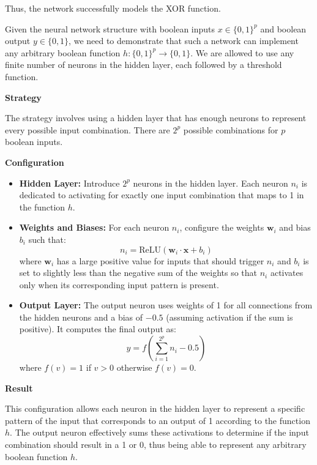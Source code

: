 \documentclass[oneside,solution]{seu-ml-assign}
\begin{document}
Thus, the network successfully models the XOR function.
\subproblem{}

Given the neural network structure with boolean inputs $x \in \{0,1\}^p$ and boolean output $y \in \{0,1\}$,
we need to demonstrate that such a network can implement any arbitrary boolean function $h:\{0,1\}^p \to \{0,1\}$.
We are allowed to use any finite number of neurons in the hidden layer, each followed by a threshold function.

\textbf{\large{Strategy}}

The strategy involves using a hidden layer that has enough neurons to represent every possible input combination.
There are $2^p$ possible combinations for $p$ boolean inputs.

\textbf{\large{Configuration}}
\begin{itemize}
  \item \textbf{Hidden Layer:} Introduce $2^p$ neurons in the hidden layer. Each neuron $n_i$ is dedicated to activating for
        exactly one input combination that maps to 1 in the function $h$.
  \item \textbf{Weights and Biases:} For each neuron $n_i$, configure the weights $\mathbf{w}_i$ and bias $b_i$ such that:
        \begin{equation}
          n_i = \text{ReLU}(\mathbf{w}_i \cdot \mathbf{x} + b_i)
        \end{equation}
        where $\mathbf{w}_i$ has a large positive value for inputs that should trigger $n_i$ and $b_i$ is set to slightly
        less than the negative sum of the weights so that $n_i$ activates only when its corresponding input pattern is present.
  \item \textbf{Output Layer:} The output neuron uses weights of 1 for all connections from the hidden neurons and a bias of $-0.5$
        (assuming activation if the sum is positive). It computes the final output as:
        \begin{equation}
          y = f\left(\sum_{i=1}^{2^p} n_i - 0.5\right)
        \end{equation}
        where $f(v) = 1$ if $v > 0$ otherwise $f(v) = 0$.
\end{itemize}

\textbf{\large{Result}}

This configuration allows each neuron in the hidden layer to represent a specific pattern of the input that corresponds to
an output of 1 according to the function $h$. The output neuron effectively sums these activations to determine if the input
combination should result in a 1 or 0, thus being able to represent any arbitrary boolean function $h$.
\end{document}
